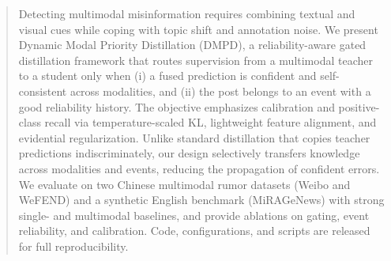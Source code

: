 \begin{abstract}
Detecting multimodal misinformation requires combining textual and visual cues while coping with topic shift and annotation noise. We present Dynamic Modal Priority Distillation (DMPD), a reliability-aware gated distillation framework that routes supervision from a multimodal teacher to a student only when (i) a fused prediction is confident and self-consistent across modalities, and (ii) the post belongs to an event with a good reliability history. The objective emphasizes calibration and positive-class recall via temperature-scaled KL, lightweight feature alignment, and evidential regularization. Unlike standard distillation that copies teacher predictions indiscriminately, our design selectively transfers knowledge across modalities and events, reducing the propagation of confident errors. We evaluate on two Chinese multimodal rumor datasets (Weibo and WeFEND) and a synthetic English benchmark (MiRAGeNews) with strong single- and multimodal baselines, and provide ablations on gating, event reliability, and calibration. Code, configurations, and scripts are released for full reproducibility.
\end{abstract}

